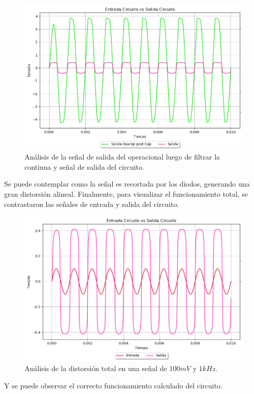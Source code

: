 \begin{figure}[H]
	\centering
	\includegraphics[width=1\textwidth, trim={0 0 0 0}, clip]{Ejercicio5/Imagenes/Circuito_base/Sim/circuito_base_tran_voop_vo.png}
	\caption{Análisis de la señal de salida del operacional luego de filtrar la continua y señal de salida del circuito.}
	\label{fig:sim_base}
\end{figure}
Se puede contemplar como la señal es recortada por los diodos, generando una gran distorsión alineal.
Finalmente, para visualizar el funcionamiento total, se contrastaron las señales de entrada y salida del circuito.
\begin{figure}[H]
	\centering
	\includegraphics[width=1\textwidth, trim={0 0 0 0}, clip]{Ejercicio5/Imagenes/Circuito_base/Sim/circuito_base_tran_vi_vo.png}
	\caption{Análisis de la distorsión total en una señal de $100mV$ y $1kHz$.}
	\label{fig:sim_base}
\end{figure}
Y se puede observar el correcto funcionamiento calculado del circuito.
